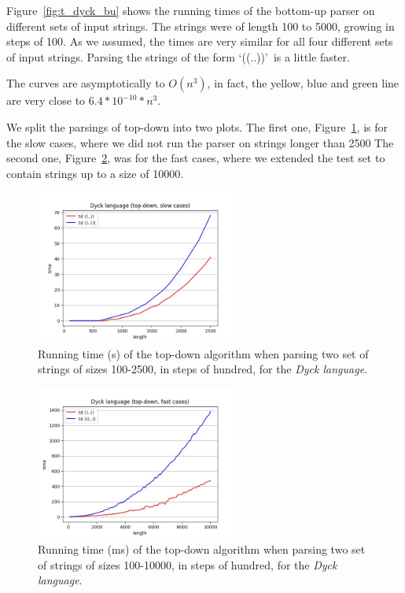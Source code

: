 Figure~\ref{fig:t_dyck_bu} shows the running times of the bottom-up parser on different sets of input strings.
The strings were of length 100 to 5000, growing in steps of 100.
As we assumed, the times are very similar for all four different sets of input strings.
Parsing the strings of the form \lq((..))\rq~is a little faster.

The curves are asymptotically to $O(n^3)$, in fact, the yellow, blue and green line are very close to $6.4*10^{-10}*n^3$.

We split the parsings of top-down into two plots.
The first one, Figure~\ref{fig:t_dyck_td_slow}, is for the slow cases, where we did not run the parser on strings longer than 2500
The second one, Figure~\ref{fig:t_dyck_td_fast}, was for the fast cases, where we extended the test set to contain strings up to a size of 10000.

\begin{figure}[h!]
    \centering
    \includegraphics[width=0.6\textwidth]{Resources/t_dyck_td_slow.jpg}
    \caption{Running time (s) of the top-down algorithm when parsing two set of strings of sizes 100-2500, in steps of hundred, for the \textit{Dyck language}.}
    \label{fig:t_dyck_td_slow}
\end{figure}

\begin{figure}[h!]
    \centering
    \includegraphics[width=0.6\textwidth]{Resources/t_dyck_td_fast.jpg}
    \caption{Running time (ms) of the top-down algorithm when parsing two set of strings of sizes 100-10000, in steps of hundred, for the \textit{Dyck language}.}
    \label{fig:t_dyck_td_fast}
\end{figure}

